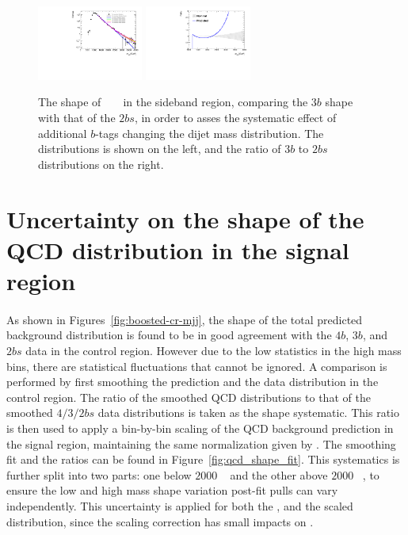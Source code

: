 \begin{figure}[htbp!]
\begin{center} 
\includegraphics[width=0.31\textwidth,angle=-90]{figures/boosted/Syst_Smooth/TopShapeSRSysfitSmooth_sig33_comp22.pdf}
\includegraphics[width=0.31\textwidth,angle=-90]{figures/boosted/Syst_Smooth/TopShapeSRSysfitSmooth_sig33_comp22_ratio.pdf}
\caption{The shape of \ttbar~ \mtwoJ~ in the sideband region,
comparing the $3b$ shape with that of the $2bs$, in order to asses the systematic effect of additional $b$-tags changing the dijet mass distribution.  The \mtwoJ~ distributions is shown on the left, and the ratio of $3b$ to $2bs$ distributions on the right.}
\label{fig:ttbar-shapes-signal}
\end{center}
\end{figure}


\section{Uncertainty on the shape of the QCD distribution in the signal region}
\label{unc-shape-qcd-in-sr}

\paragraph{}
As shown in Figures~\ref{fig:boosted-cr-mjj}, the shape of the total predicted background distribution is found to be in good agreement with the $4b$, $3b$, and $2bs$ data in the control region. 
However due to the low statistics in the high \mtwoJ mass bins, there are statistical fluctuations that cannot be ignored. 
A comparison is performed by first smoothing the prediction and the data distribution in the control region. 
The ratio of the smoothed QCD distributions to that of the smoothed $4/3/2bs$ data distributions is taken as the shape systematic. 
This ratio is then used to apply a bin-by-bin scaling of the QCD background prediction in the signal region, maintaining the same normalization given by \muqcd.  
The smoothing fit and the ratios can be found in Figure~\ref{fig:qcd_shape_fit}. 
This systematics is further split into two parts: one below $2000$ \GeV~ and the other above $2000$ \GeV~, to ensure the low and high mass shape variation post-fit pulls can vary independently.
This uncertainty is applied for both the \mtwoJ, and the scaled \mtwoJ~ distribution, since the scaling correction has small impacts on \mtwoJ. 

